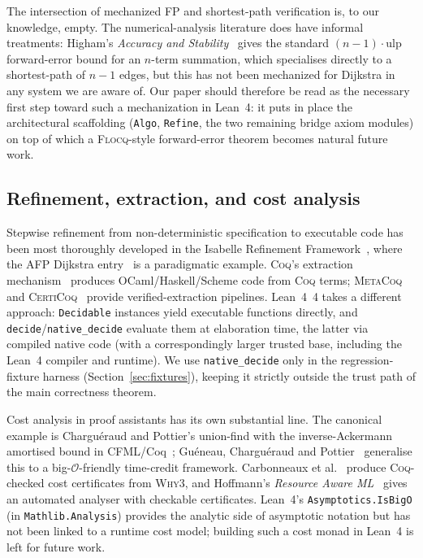 \documentclass[11pt,a4paper]{article}
\providecommand{\cref}[1]{Section~\ref{#1}}
\newcommand{\Lean}{Lean~4\xspace}
\newcommand{\Dijkstra}{Dijkstra\xspace}
\newcommand{\Bigo}{\mathcal{O}}
\newcommand{\code}[1]{\texttt{#1}}
\theoremstyle{plain}
\theoremstyle{definition}
\begin{document}
The intersection of mechanized FP and shortest-path verification is, to our
knowledge, empty. The numerical-analysis literature does have informal
treatments: Higham's \emph{Accuracy and
Stability}~\cite[Ch.~4]{Higham2002Accuracy} gives the standard
$(n-1)\cdot\mathrm{ulp}$ forward-error bound for an $n$-term summation, which
specialises directly to a shortest-path of $n-1$ edges, but this has not
been mechanized for \Dijkstra{} in any system we are aware of. Our paper
should therefore be read as the necessary first step toward such a
mechanization in \Lean: it puts in place the architectural scaffolding
(\code{Algo}, \code{Refine}, the two remaining bridge axiom modules) on top of which a
\textsc{Flocq}-style forward-error theorem becomes natural future work.

\subsection{Refinement, extraction, and cost analysis}\label{sec:rel-cost}

Stepwise refinement from non-deterministic specification to executable code
has been most thoroughly developed in the Isabelle Refinement
Framework~\cite{NordhoffLammich2012,Lammich2019JAR,Lammich2019LLVM}, where
the AFP \Dijkstra{} entry~\cite{NordhoffLammich2012} is a paradigmatic
example. \textsc{Coq}'s extraction
mechanism~\cite{Letouzey2002Extraction} produces OCaml/Haskell/Scheme code
from \textsc{Coq} terms; \textsc{MetaCoq}~\cite{Sozeau2020MetaCoq} and
\textsc{CertiCoq}~\cite{CertiCoq2017} provide verified-extraction pipelines.
\Lean{}~4 takes a different approach: \code{Decidable} instances yield
executable functions directly, and \code{decide}/\code{native\_decide}
evaluate them at elaboration time, the latter via compiled native code
(with a correspondingly larger trusted base, including the \Lean{} compiler
and runtime). We use \code{native\_decide} only in the regression-fixture
harness (\cref{sec:fixtures}), keeping it strictly outside the trust path of
the main correctness theorem.

Cost analysis in proof assistants has its own substantial line. The canonical
example is Charguéraud and Pottier's union-find with the inverse-Ackermann
amortised bound in \textsc{CFML}/Coq~\cite{CharguraudPottier2015UnionFind,CharguraudPottier2019JAR};
Guéneau, Charguéraud and Pottier~\cite{GueneauChargueraudPottier2018ESOP}
generalise this to a big-$\Bigo$-friendly time-credit framework. Carbonneaux
et al.~\cite{CarbonneauxHoffmannRepsShao2017CAV} produce \textsc{Coq}-checked
cost certificates from \textsc{Why3}, and Hoffmann's \emph{Resource Aware
ML}~\cite{Hoffmann2017RaML} gives an automated analyser with checkable
certificates. \Lean's \code{Asymptotics.IsBigO} (in \code{Mathlib.Analysis})
provides the analytic side of asymptotic notation but has not been linked to
a runtime cost model; building such a cost monad in \Lean{} is left for
future work.
\end{document}
